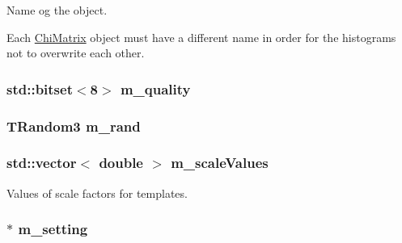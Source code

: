 Name og the object. 

Each \hyperlink{classTemplateMethod_1_1ChiMatrix}{Chi\+Matrix} object must have a different name in order for the histograms not to overwrite each other. \hypertarget{classTemplateMethod_1_1ChiMatrix_abe1a953be03b8ed2e7639c4d7be51210}{
\subsubsection[{m\+\_\+quality}]{\setlength{\rightskip}{0pt plus 5cm}std\+::bitset$<$8$>$ m\+\_\+quality\hspace{0.3cm}{\ttfamily [private]}}}\label{classTemplateMethod_1_1ChiMatrix_abe1a953be03b8ed2e7639c4d7be51210}
\hypertarget{classTemplateMethod_1_1ChiMatrix_a163ee2f68cb0c91fc7d6923b33028183}{
\subsubsection[{m\+\_\+rand}]{\setlength{\rightskip}{0pt plus 5cm}T\+Random3 m\+\_\+rand\hspace{0.3cm}{\ttfamily [private]}}}\label{classTemplateMethod_1_1ChiMatrix_a163ee2f68cb0c91fc7d6923b33028183}
\hypertarget{classTemplateMethod_1_1ChiMatrix_a22a7e8747d1d3b1ba2788ead0f173eb0}{
\subsubsection[{m\+\_\+scale\+Values}]{\setlength{\rightskip}{0pt plus 5cm}std\+::vector$<$ double $>$ m\+\_\+scale\+Values\hspace{0.3cm}{\ttfamily [private]}}}\label{classTemplateMethod_1_1ChiMatrix_a22a7e8747d1d3b1ba2788ead0f173eb0}


Values of scale factors for templates. 

\hypertarget{classTemplateMethod_1_1ChiMatrix_aa69e10c69639252d1df706a733eee113}{
\subsubsection[{m\+\_\+setting}]{$\ast$ m\+\_\+setting\hspace{0.3cm}{\ttfamily [private]}}}\label{classTemplateMethod_1_1ChiMatrix_aa69e10c69639252d1df706a733eee113}


